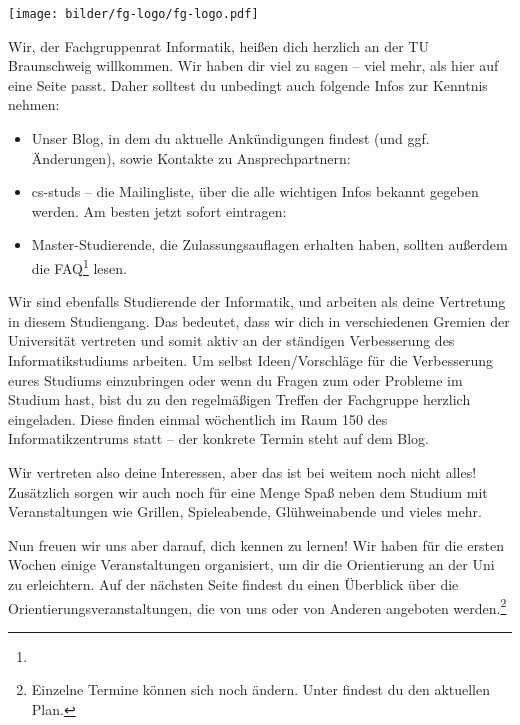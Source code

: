 \documentclass[
  final,
  a4paper,              %
  style=screen,
  nexus,                %
  bookmarkpackage=false
]{tubsartcl}
\begin{document}
\pagestyle{empty}


\begin{center}
\noindent\texttt{[image: bilder/fg-logo/fg-logo.pdf]}
\end{center}

\listoftodos


\noindent{}Wir, der Fachgruppenrat Informatik, heißen dich herzlich an der TU Braunschweig willkommen. 
Wir haben dir viel zu sagen – viel mehr, als hier auf eine Seite passt. Daher solltest du unbedingt auch folgende Infos zur Kenntnis nehmen:

\begin{itemize}[topsep=0em,itemsep=-1ex,partopsep=0em,parsep=1ex]
\item Unser Blog, in dem du aktuelle Ankündigungen findest (und ggf. Änderungen), sowie Kontakte zu Ansprechpartnern: \\ \fginfoUrl

\item cs-studs -- die Mailingliste, über die alle wichtigen Infos bekannt gegeben werden. Am besten jetzt sofort eintragen: \\

\item Master-Studierende, die Zulassungsauflagen erhalten haben, sollten außerdem die FAQ\footnote{} lesen.
\end{itemize}

\noindent{}Wir sind ebenfalls Studierende der Informatik, und arbeiten als deine Vertretung in diesem Studiengang. Das bedeutet, dass wir dich in verschiedenen Gremien der Universität vertreten und somit aktiv an der ständigen Verbesserung des Informatikstudiums arbeiten. Um selbst Ideen/Vorschläge für die Verbesserung eures Studiums einzubringen oder wenn du Fragen zum oder Probleme im Studium hast, bist du zu den regelmäßigen Treffen der Fachgruppe herzlich eingeladen. Diese finden einmal wöchentlich im Raum 150 des Informatikzentrums statt – der konkrete Termin steht auf dem Blog.

Wir vertreten also deine Interessen, aber das ist bei weitem noch nicht alles! Zusätzlich sorgen wir auch noch für eine Menge Spaß neben dem Studium mit Veranstaltungen wie Grillen, Spieleabende, Glühweinabende und vieles mehr.

Nun freuen wir uns aber darauf, dich kennen zu lernen! Wir haben für die ersten Wochen einige Veranstaltungen organisiert, um dir die Orientierung an der Uni zu erleichtern. Auf der nächsten Seite findest du einen Überblick über die Orientierungsveranstaltungen, die von uns oder von Anderen angeboten werden.\footnote{Einzelne Termine können sich noch ändern. Unter  findest du den aktuellen Plan.}
\end{document}
